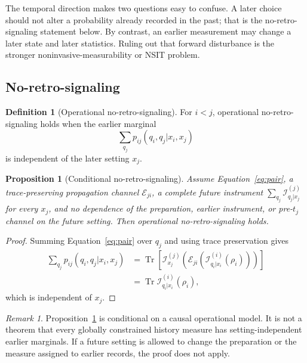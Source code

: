 \documentclass[11pt]{article}
\newtheorem{proposition}{Proposition}
\theoremstyle{definition}
\newtheorem{definition}{Definition}
\theoremstyle{remark}
\newtheorem{remark}{Remark}
\begin{document}
The temporal direction makes two questions easy to confuse.  A later choice
should not alter a probability already recorded in the past; that is the
no-retro-signaling statement below.  By contrast, an earlier measurement may
change a later state and later statistics.  Ruling out that forward
disturbance is the stronger noninvasive-measurability or NSIT problem.

\subsection{No-retro-signaling}

\begin{definition}[Operational no-retro-signaling]
For $i<j$, operational no-retro-signaling holds when the earlier marginal
\[
 \sum_{q_j}p_{ij}(q_i,q_j|x_i,x_j)
\]
is independent of the later setting $x_j$.
\end{definition}

\begin{proposition}[Conditional no-retro-signaling]
\label{prop:nrs}
Assume Equation~\eqref{eq:pair}, a trace-preserving propagation channel
$\mathcal E_{ji}$, a complete future instrument
$\sum_{q_j}\mathcal I^{(j)}_{q_j|x_j}$ for every $x_j$, and no dependence of
the preparation, earlier instrument, or pre-$t_j$ channel on the future
setting.  Then operational no-retro-signaling holds.
\end{proposition}

\begin{proof}
Summing Equation~\eqref{eq:pair} over $q_j$ and using trace preservation gives
\begin{align*}
\sum_{q_j}p_{ij}(q_i,q_j|x_i,x_j)
&=\operatorname{Tr}\!\left[
\mathcal I^{(j)}_{x_j}\!\left(
\mathcal E_{ji}\!\left(
\mathcal I^{(i)}_{q_i|x_i}(\rho_i)
\right)\right)
\right]\\
&=\operatorname{Tr}\mathcal I^{(i)}_{q_i|x_i}(\rho_i),
\end{align*}
which is independent of $x_j$.
\end{proof}

\begin{remark}
Proposition~\ref{prop:nrs} is conditional on a causal operational model.  It
is not a theorem that every globally constrained history measure has
setting-independent earlier marginals.  If a future setting is allowed to
change the preparation or the measure assigned to earlier records, the proof
does not apply.
\end{remark}
\end{document}
